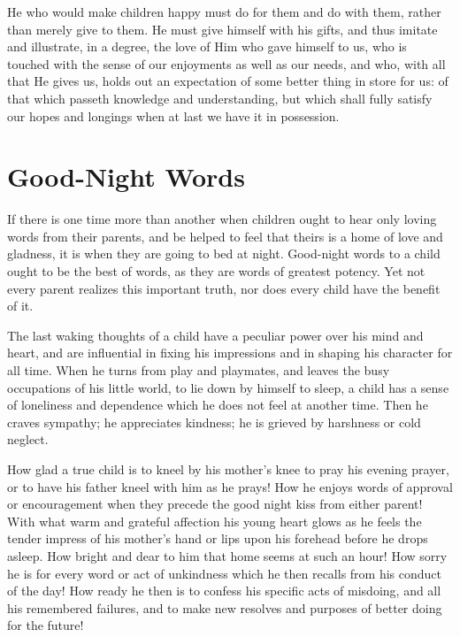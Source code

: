 \documentclass[
]{book}
\begin{document}
He who would make children happy must do for them and do with them, rather than merely give to them. He must give himself with his gifts, and thus imitate and illustrate, in a degree, the love of Him who gave himself to us, who is touched with the sense of our enjoyments as well as our needs, and who, with all that He gives us, holds out an expectation of some better thing in store for us: of that which passeth knowledge and understanding, but which shall fully satisfy our hopes and longings when at last we have it in possession.

\hypertarget{good-night-words}{%
\chapter{Good-Night Words}\label{good-night-words}}

If there is one time more than another when children ought to hear only loving words from their parents, and be helped to feel that theirs is a home of love and gladness, it is when they are going to bed at night. Good-night words to a child ought to be the best of words, as they are words of greatest potency. Yet not every parent realizes this important truth, nor does every child have the benefit of it.

The last waking thoughts of a child have a peculiar power over his mind and heart, and are influential in fixing his impressions and in shaping his character for all time. When he turns from play and playmates, and leaves the busy occupations of his little world, to lie down by himself to sleep, a child has a sense of loneliness and dependence which he does not feel at another time. Then he craves sympathy; he appreciates kindness; he is grieved by harshness or cold neglect.

How glad a true child is to kneel by his mother's knee to pray his evening prayer, or to have his father kneel with him as he prays! How he enjoys words of approval or encouragement when they precede the good night kiss from either parent! With what warm and grateful affection his young heart glows as he feels the tender impress of his mother's hand or lips upon his forehead before he drops asleep. How bright and dear to him that home seems at such an hour! How sorry he is for every word or act of unkindness which he then recalls from his conduct of the day! How ready he then is to confess his specific acts of misdoing, and all his remembered failures, and to make new resolves and purposes of better doing for the future!
\end{document}
